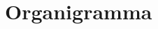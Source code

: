 \documentclass[../PianoProgetto.tex]{subfiles}
\begin{document}
\section{Organigramma}
\end{document}
